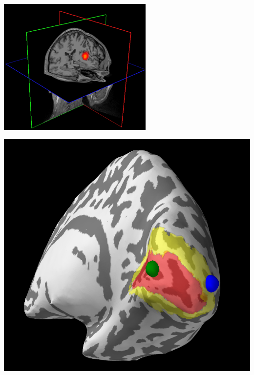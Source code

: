 \documentclass[t,11pt,compress]{beamer} %
\begin{document}
\begin{frame}[plain,t,c]
\begin{minipage}{1.09\linewidth}
\begin{minipage}{.16\linewidth}
\end{minipage}%
\hspace{.4em}%
\begin{minipage}{.165\linewidth}
    \includegraphics[width=\linewidth]{volume_tc.png}%
\end{minipage}%
\hspace{.4em}%
\begin{minipage}{.155\linewidth}
    \includegraphics[width=\linewidth]{tf_mxne.png}%

\end{minipage}
\end{minipage}
\end{frame}
\end{document}
